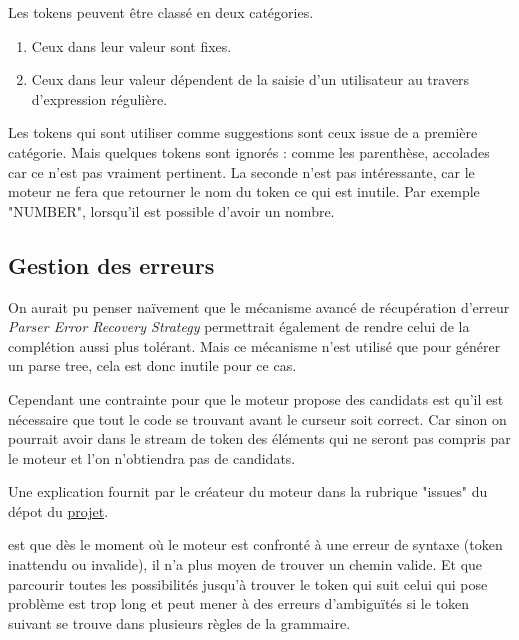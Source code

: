 \documentclass[
    iict, %
    il, %
]{heig-tb}
\begin{document}
Les tokens peuvent être classé en deux catégories.

\begin{enumerate}
    \item Ceux dans leur valeur sont fixes.
    \item Ceux dans leur valeur dépendent de la saisie d'un utilisateur au travers d'expression régulière.
\end{enumerate}

Les tokens qui sont utiliser comme suggestions sont ceux issue de a première catégorie. Mais quelques tokens sont ignorés : comme les parenthèse, accolades car ce n'est pas vraiment pertinent. %
La seconde n'est pas intéressante, car le moteur ne fera que retourner le nom du token ce qui est inutile. Par exemple "NUMBER", lorsqu'il est possible d'avoir un nombre.

\subsection{Gestion des erreurs }\label{error handle}

On aurait pu penser naïvement que le mécanisme avancé de récupération d'erreur \emph{Parser Error Recovery Strategy} permettrait également de rendre celui de la complétion aussi plus tolérant.
Mais ce mécanisme n'est utilisé que pour générer un parse tree, cela est donc inutile pour ce cas. %

Cependant une contrainte pour que le moteur propose des candidats est qu'il est nécessaire que tout le code se trouvant avant le curseur soit correct.
Car sinon on pourrait avoir dans le stream de token des éléments qui ne seront pas compris par le moteur et l'on n’obtiendra pas de candidats.

Une explication fournit par le créateur du moteur dans la rubrique "issues" du dépot du \href{ https://github.com/mike-lischke/antlr4-c3/issues/29}{projet}.

est que dès le moment où le moteur est confronté à une erreur de syntaxe (token inattendu ou invalide), il n'a plus moyen de trouver un chemin valide.
Et que parcourir toutes les possibilités jusqu'à trouver le token qui suit celui qui pose problème est trop long et peut mener à des erreurs d'ambiguïtés si le token suivant se trouve dans plusieurs règles de la grammaire.
\end{document}
